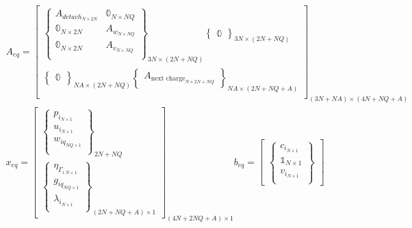 \documentclass[conference]{IEEEtran}
\begin{document}
\begin{equation}
\begin{array}{c}
A_{eq} =
\begin{bmatrix}
    \begin{Bmatrix}
        A_{detach_{N \times 2N}}    & \mathbb{0}_{N \times NQ} \\
        \mathbb{0}_{N \times 2N} & A_{w_{N \times NQ}}          \\
        \mathbb{0}_{N \times 2N} & A_{v_{N \times NQ}}          \\
    \end{Bmatrix}_{3N \times (2N + NQ)}
    \begin{Bmatrix}
        \mathbb{0}
    \end{Bmatrix}_{3N \times (2N + NQ)} \\
    \begin{Bmatrix}
        \mathbb{0}_{}
    \end{Bmatrix}_{NA \times (2N + NQ)}
    \begin{Bmatrix}
        A_{\textrm{next charge}_{N \times 2N + NQ}}
    \end{Bmatrix}_{NA \times (2N + NQ + A)} \\
\end{bmatrix}_{(3N + NA) \times (4N + NQ + A)} \\
x_{eq} =
\begin{bmatrix}
    \begin{Bmatrix}
        p_{i_{N \times 1}} \\
        u_{i_{N \times 1}} \\
        w_{iq_{NQ \times 1}} \\
    \end{Bmatrix}_{2N + NQ} \\
    \begin{Bmatrix}
        \eta_{\Gamma_{i\; N \times 1}} \\
        g_{iq_{NQ \times 1}}           \\
        \lambda_{i_{N \times 1}}       \\
    \end{Bmatrix}_{(2N + NQ + A) \times 1}
\end{bmatrix}_{(4N + 2NQ + A) \times 1}
b_{eq} =
\begin{bmatrix}
    \begin{Bmatrix}
        c_{i_{N \times 1}} \\
        \mathbb{1}_{N \times 1} \\
        v_{i_{N \times 1}} \\

\end{Bmatrix}
\end{bmatrix}
\end{array}
\end{equation}
\end{document}
